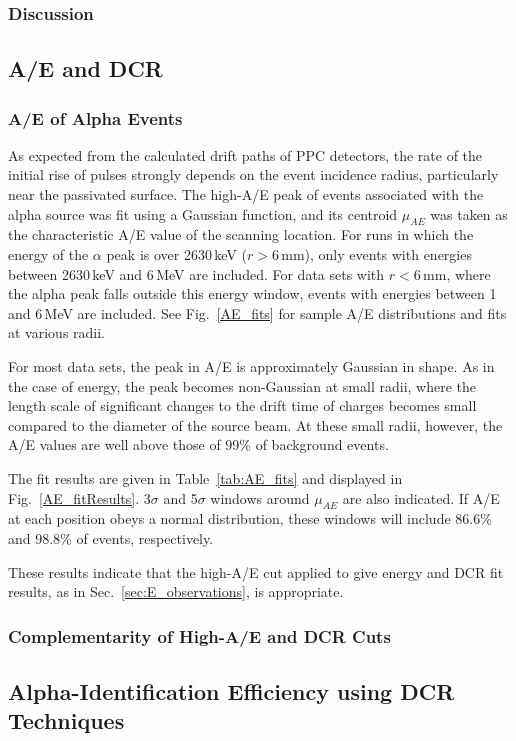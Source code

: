\documentclass[groupedaddress,rmp,amsmath,amssymb,bibnotes,altaffilletter,twocolumn]{revtex4-1}
\begin{document}
\subsubsection{Discussion}


\subsection{A/E and DCR} 
\subsubsection{A/E of Alpha Events}
As expected from the calculated drift paths of PPC detectors, the rate of the initial rise of pulses strongly depends on the event incidence radius, particularly near the passivated surface. The high-A/E peak of events associated with the alpha source was fit using a Gaussian function, and its centroid $\mu_{AE}$ was taken as the characteristic A/E value of the scanning location. For runs in which the energy of the $\alpha$ peak is over 2630\,keV ($r > 6$\,mm), only events with energies between 2630\,keV and 6\,MeV are included. For data sets with $r < 6$\,mm, where the alpha peak falls outside this energy window, events with energies between 1 and 6\,MeV are included. See Fig.~\ref{AE_fits} for sample A/E distributions and fits at various radii. 

For most data sets, the peak in A/E is approximately Gaussian in shape. As in the case of energy, the peak becomes non-Gaussian at small radii, where the length scale of significant changes to the drift time of charges becomes small compared to the diameter of the source beam. At these small radii, however, the A/E values are well above those of 99\% of background events. 

The fit results are given in Table~\ref{tab:AE_fits} and displayed in Fig.~\ref{AE_fitResults}. 3$\sigma$ and 5$\sigma$ windows around $\mu_{AE}$ are also indicated. If A/E at each position obeys a normal distribution, these windows will include 86.6\% and 98.8\% of events, respectively.

These results indicate that the high-A/E cut applied to give energy and DCR fit results,  as in Sec.~\ref{sec:E_observations}, is appropriate.

\subsubsection{Complementarity of High-A/E and DCR Cuts}

\subsection{Alpha-Identification Efficiency using DCR Techniques}
\end{document}
